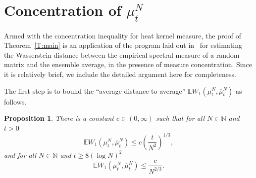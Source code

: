 \documentclass[11pt]{article}
\newtheorem{prop}[theo]{Proposition}
\theoremstyle{definition}
\numberwithin{equation}{section}
\numberwithin{figure}{section}
\numberwithin{table}{section}
\newcommand{\E}{\mathbb{E}}
\begin{document}
\section{Concentration of \texorpdfstring{$\mu_t^N$}{mu t N}}\label{s.concentration}

Armed with the concentration inequality for heat kernel measure, the proof of Theorem~\ref{T:main} is an application of the program laid out in~\cite{MM2016} for estimating the Wasserstein distance between the empirical spectral measure of a random matrix and the ensemble average, in the presence of measure concentration. Since it is relatively brief, we include the detailed argument here for completeness.

The first step is to bound the ``average distance to average'' $\E W_1(\mu^N_t,\overline{\mu}^N_t)$ as follows.

\begin{prop}\label{T:avg-to-avg}
There is a constant $c\in(0,\infty)$ such that for all $N\in\mathbb{N}$ and $t>0$
\[
\E W_1(\mu^N_t,\overline{\mu}^N_t)\le c\left(\frac{t}{N^2}\right)^{1/3},
\]
and for all $N\in\mathbb{N}$ and $t\ge8(\log N)^2$
\[
\E W_1(\mu^N_t,\overline{\mu}^N_t)\le
\frac{c}{N^{2/3}}.
\]
\end{prop}
\end{document}
